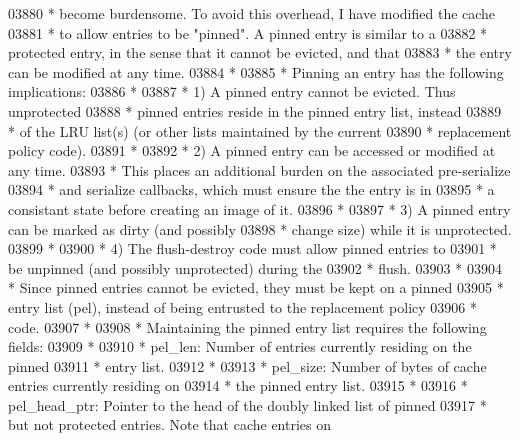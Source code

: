 \begin{DoxyCode}
03880 \textcolor{comment}{ * become burdensome.  To avoid this overhead, I have modified the cache}
03881 \textcolor{comment}{ * to allow entries to be "pinned".  A pinned entry is similar to a}
03882 \textcolor{comment}{ * protected entry, in the sense that it cannot be evicted, and that}
03883 \textcolor{comment}{ * the entry can be modified at any time.}
03884 \textcolor{comment}{ *}
03885 \textcolor{comment}{ * Pinning an entry has the following implications:}
03886 \textcolor{comment}{ *}
03887 \textcolor{comment}{ *  1) A pinned entry cannot be evicted.  Thus unprotected}
03888 \textcolor{comment}{ *         pinned entries reside in the pinned entry list, instead}
03889 \textcolor{comment}{ *         of the LRU list(s) (or other lists maintained by the current}
03890 \textcolor{comment}{ *         replacement policy code).}
03891 \textcolor{comment}{ *}
03892 \textcolor{comment}{ *      2) A pinned entry can be accessed or modified at any time.}
03893 \textcolor{comment}{ *         This places an additional burden on the associated pre-serialize}
03894 \textcolor{comment}{ *     and serialize callbacks, which must ensure the the entry is in }
03895 \textcolor{comment}{ *     a consistant state before creating an image of it.}
03896 \textcolor{comment}{ *}
03897 \textcolor{comment}{ *      3) A pinned entry can be marked as dirty (and possibly}
03898 \textcolor{comment}{ *         change size) while it is unprotected.}
03899 \textcolor{comment}{ *}
03900 \textcolor{comment}{ *      4) The flush-destroy code must allow pinned entries to}
03901 \textcolor{comment}{ *         be unpinned (and possibly unprotected) during the}
03902 \textcolor{comment}{ *         flush.}
03903 \textcolor{comment}{ *}
03904 \textcolor{comment}{ * Since pinned entries cannot be evicted, they must be kept on a pinned}
03905 \textcolor{comment}{ * entry list (pel), instead of being entrusted to the replacement policy }
03906 \textcolor{comment}{ * code.}
03907 \textcolor{comment}{ *}
03908 \textcolor{comment}{ * Maintaining the pinned entry list requires the following fields:}
03909 \textcolor{comment}{ *}
03910 \textcolor{comment}{ * pel\_len: Number of entries currently residing on the pinned}
03911 \textcolor{comment}{ *      entry list.}
03912 \textcolor{comment}{ *}
03913 \textcolor{comment}{ * pel\_size:    Number of bytes of cache entries currently residing on}
03914 \textcolor{comment}{ *      the pinned entry list.}
03915 \textcolor{comment}{ *}
03916 \textcolor{comment}{ * pel\_head\_ptr: Pointer to the head of the doubly linked list of pinned}
03917 \textcolor{comment}{ *      but not protected entries.  Note that cache entries on}

\end{DoxyCode}
